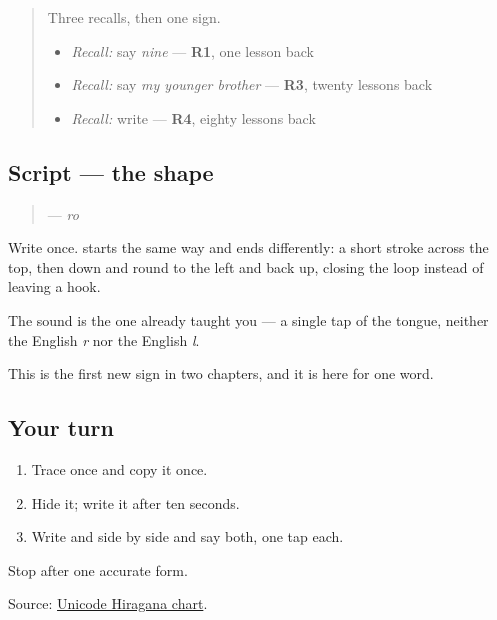 \label{lesson:JA-W15-ro}



\begin{quote}
Three recalls, then one sign.

\begin{itemize}
\raggedright
  \item \emph{Recall:} say \emph{nine} — \textbf{R1}, one lesson back
  \item \emph{Recall:} say \emph{my younger brother} — \textbf{R3}, twenty lessons back
  \item \emph{Recall:} write \textbf{} — \textbf{R4}, eighty lessons back
\end{itemize}
\end{quote}

\subsection*{Script — the shape}

\begin{quote}
\textbf{} — \emph{ro}
\end{quote}

Write \textbf{} once. \textbf{} starts the same way and ends differently: a short stroke across the top, then down and round to the left and back up, closing the loop instead of leaving a hook.

The sound is the one \textbf{} already taught you — a single tap of the tongue, neither the English \emph{r} nor the English \emph{l}.

This is the first new sign in two chapters, and it is here for one word.

\subsection*{Your turn}
\begin{enumerate}
\raggedright
  \item Trace \textbf{} once and copy it once.
  \item Hide it; write it after ten seconds.
  \item Write \textbf{} and \textbf{} side by side and say both, one tap each.
\end{enumerate}

\begin{tcolorbox}[breakable,colback=teal!4,colframe=teal!35!black,title={Before you move on}]
Stop after one accurate form.

Source: \href{https://www.unicode.org/charts/PDF/U3040.pdf}{Unicode Hiragana chart}.
\end{tcolorbox}
